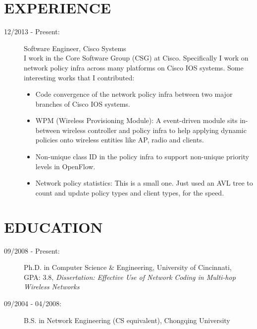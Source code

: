 \documentclass[line]{res}
\begin{document}
\address{350 Elan Village Ln \#111 \\ San Jose, CA 95134 \\ 513-679-0772}
\address{Email: \href{mailto:yang@yangchi.me}{yang@yangchi.me} \\ Github: \url{https://github.com/yangchi} }

\begin{resume}
	\section{EXPERIENCE}
	\begin{description}
		\item[12/2013 - Present:] Software Engineer, Cisco Systems \\
		I work in the Core Software Group (CSG) at Cisco. Specifically I work on network policy infra across many platforms on Cisco IOS systems. Some interesting works that I contributed:
            \begin{itemize}
            \item Code convergence of the network policy infra between two major branches of Cisco IOS systems.
            \item WPM (Wireless Provisioning Module): A event-driven module sits in-between wireless controller and policy infra to help applying dynamic policies onto wireless entities like AP, radio and clients.
            \item Non-unique class ID in the policy infra to support non-unique priority levels in OpenFlow.
            \item Network policy statistics: This is a small one. Just used an AVL tree to count and update policy types and client types, for the speed.
            \end{itemize}
	\end{description}
	\section{EDUCATION}
	\begin{description}
		\item[09/2008 - Present:] Ph.D. in Computer Science \& Engineering, University of Cincinnati, \\
			GPA: 3.8, \emph{Dissertation: Effective Use of Network Coding in Multi-hop Wireless Networks}
		\item[09/2004 - 04/2008:] B.S. in Network Engineering (CS equivalent), Chongqing University
	\end{description}
	

\end{resume}
\end{document}
